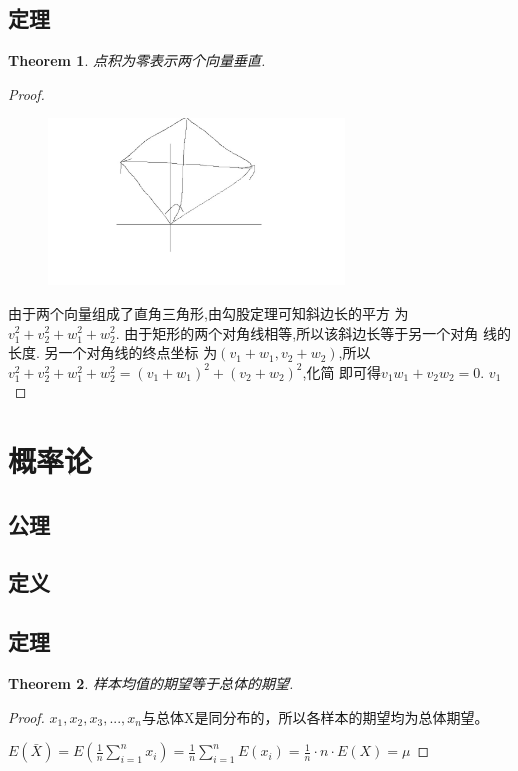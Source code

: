 \documentclass[UTF-8]{ctexart}
\newtheorem{theorem}{Theorem}[section]
\newtheorem{proof}{Proof}[section]
\begin{document}
\subsection{定理}
\begin{theorem}
  点积为零表示两个向量垂直.

\end{theorem}


\begin{proof}
  \begin{figure}[H] %
    \centering %
    \includegraphics[width=0.7\textwidth]{images/math/1.jpg} %
  \end{figure}
  由于两个向量组成了直角三角形,由勾股定理可知斜边长的平方
  为$v_1^2+v_2^2+w_1^2+w_2^2$. 由于矩形的两个对角线相等,所以该斜边长等于另一个对角
  线的长度. 另一个对角线的终点坐标
  为$(v_1+w_1,v_2+w_2)$,所以$v_1^2+v_2^2+w_1^2+w_2^2=(v_1+w_1)^2+(v_2+w_2)^2$,化简
  即可得$v_1w_1+v_2w_2=0$. $v_1$	
\end{proof}


\newpage
\section{概率论}

\subsection{公理}
\subsection{定义}
\subsection{定理}
\begin{theorem}
样本均值的期望等于总体的期望.
\end{theorem}
\begin{proof}
$x_1,x_2,x_3,...,x_n$与总体X是同分布的，所以各样本的期望均为总体期望。

$E(\bar{X})=E(\frac{1}{n}\sum_{i=1}^{n}x_{i})=\frac{1}{n}\sum_{i=1}^{n}E(x_{i})=\frac{1}{n}\cdot n\cdot E(X)=\mu $
\end{proof}
\end{document}
